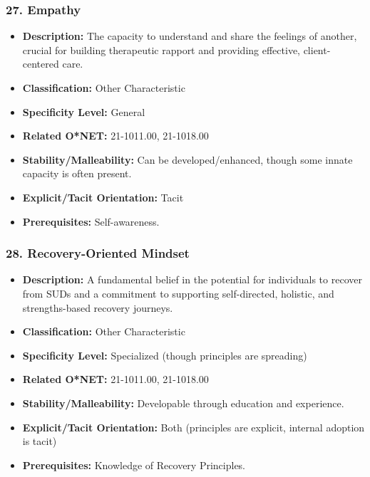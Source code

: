 \documentclass[
  letterpaper,
  DIV=11,
  numbers=noendperiod]{scrartcl}
\providecommand{\tightlist}{%
  \setlength{\itemsep}{0pt}\setlength{\parskip}{0pt}}
\begin{document}
\subsubsection{27. Empathy}\label{empathy}

\begin{itemize}
\tightlist
\item
  \textbf{Description:} The capacity to understand and share the
  feelings of another, crucial for building therapeutic rapport and
  providing effective, client-centered care.
\item
  \textbf{Classification:} Other Characteristic
\item
  \textbf{Specificity Level:} General
\item
  \textbf{Related O*NET:} 21-1011.00, 21-1018.00
\item
  \textbf{Stability/Malleability:} Can be developed/enhanced, though
  some innate capacity is often present.
\item
  \textbf{Explicit/Tacit Orientation:} Tacit
\item
  \textbf{Prerequisites:} Self-awareness.
\end{itemize}

\subsubsection{28. Recovery-Oriented
Mindset}\label{recovery-oriented-mindset}

\begin{itemize}
\tightlist
\item
  \textbf{Description:} A fundamental belief in the potential for
  individuals to recover from SUDs and a commitment to supporting
  self-directed, holistic, and strengths-based recovery journeys.
\item
  \textbf{Classification:} Other Characteristic
\item
  \textbf{Specificity Level:} Specialized (though principles are
  spreading)
\item
  \textbf{Related O*NET:} 21-1011.00, 21-1018.00
\item
  \textbf{Stability/Malleability:} Developable through education and
  experience.
\item
  \textbf{Explicit/Tacit Orientation:} Both (principles are explicit,
  internal adoption is tacit)
\item
  \textbf{Prerequisites:} Knowledge of Recovery Principles.
\end{itemize}
\end{document}
